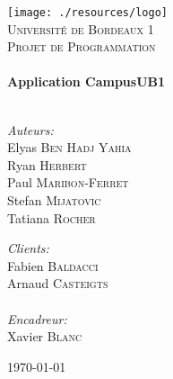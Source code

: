 \begin{titlepage}
\begin{center}

\texttt{[image: ./resources/logo]}~\\[1cm]

\textsc{\LARGE Université de Bordeaux 1}\\[1.5cm]

\textsc{\Large {Projet de Programmation}}\\[0.5cm]

\HRule \\[0.4cm]
{ \huge \bfseries Application CampusUB1}\\[0.4cm]

\HRule \\[1.5cm]

\begin{minipage}{0.4\textwidth}
\begin{flushleft} \large
\emph{Auteurs:} \\
Elyas \textsc{Ben Hadj Yahia}\\
Ryan \textsc{Herbert}\\
Paul \textsc{Maribon-Ferret}\\
Stefan \textsc{Mijatovic}\\
Tatiana \textsc{Rocher}
\end{flushleft}
\end{minipage}
\begin{minipage}{0.4\textwidth}
\begin{flushright} \large
\emph{Clients:} \\
Fabien \textsc{Baldacci}\\
Arnaud \textsc{Casteigts}\\
\emph{\\Encadreur:} \\
Xavier \textsc{Blanc}
\end{flushright}
\end{minipage}

\vfill

{\large \today}

\end{center}
\end{titlepage}